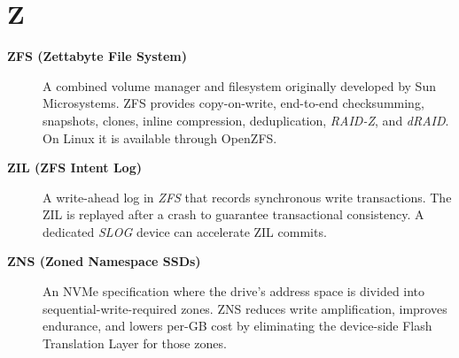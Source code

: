 \section*{Z}

\begin{description}

\item[\textbf{ZFS (Zettabyte File System)}]
A combined volume manager and filesystem originally developed by Sun
Microsystems. ZFS provides copy-on-write, end-to-end checksumming,
snapshots, clones, inline compression, deduplication, \textit{RAID-Z}, and
\textit{dRAID}. On Linux it is available through OpenZFS.

\item[\textbf{ZIL (ZFS Intent Log)}]
A write-ahead log in \textit{ZFS} that records synchronous write
transactions. The ZIL is replayed after a crash to guarantee transactional
consistency. A dedicated \textit{SLOG} device can accelerate ZIL commits.

\item[\textbf{ZNS (Zoned Namespace SSDs)}]
An NVMe specification where the drive's address space is divided into
sequential-write-required zones. ZNS reduces write amplification, improves
endurance, and lowers per-GB cost by eliminating the device-side Flash
Translation Layer for those zones.

\end{description}
